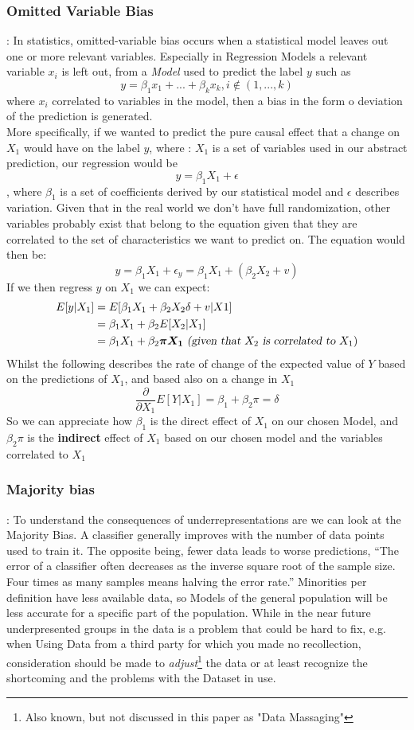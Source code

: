 \subsubsection{Omitted Variable Bias}:
In statistics, omitted-variable bias occurs when a statistical model leaves out one or more relevant variables. Especially in Regression Models a relevant variable $x_i$ is left out, from a \textsl{Model} used to predict the label $y$ such as $$y = \beta_1 x_1 + ... +\beta_k x_k, i\notin (1,...,k) $$ where $x_i$ correlated to variables in the model, then a bias in the form o deviation of the prediction is generated.\\
More specifically, if we wanted to predict the pure causal effect that a change on $X_1$ would have on the label $y$, where : $X_1$ is a set of variables used in our abstract prediction, our  regression would be $$y = \beta_1X_1 + \epsilon$$, where $\beta_1$ is a set of coefficients derived by our statistical model and $\epsilon$ describes variation. Given that in the real world we don't have full randomization, other variables probably exist that belong to the equation given that they are correlated to the set of characteristics we want to predict on. The equation would then be: $$y = \beta_1X_1 + \epsilon_y = \beta_1X_1 + (\beta_2X_2 + v)$$ If we then regress $y$ on $X_1$ we can expect:
\begin{align*}
  E[y|X_1] & = E[\beta_1X_1 + \beta_2X_2\delta+v | X1] \\
  &= \beta_1X_1 + \beta_2E[X_2|X_1] \\
  &= \beta_1X_1 + \beta_2\boldsymbol{\pi X_1}\textsl{ (given that } X_2 \textsl{ is correlated to } X_1)
\end{align*}
Whilst the following describes the rate of change of the expected value of $Y$ based on the predictions of $X_1$, and based also on a change in $X_1$
$$\frac{\partial}{\partial X_1}E[Y|X_1] = \beta_1 + \beta_2 \pi = \delta$$
So we can appreciate how $\beta_1$ is the direct effect of $X_1$ on our chosen Model, and $\beta_2 \pi$ is the \textbf{indirect} effect of $X_1$ based on our chosen model and the variables correlated to $X_1$
\subsubsection{Majority bias}:\label{MajorityBias}
To understand the consequences of underrepresentations are we can look at the Majority Bias.
A classifier generally improves with the number of data points used to train it. The opposite being, fewer data leads to worse predictions, “The error of a classifier often decreases as the inverse square root of the sample size. Four times as many samples means halving the error rate.” \cite{Varo18}
Minorities per definition have less available data, so Models of the general population will be less accurate for a specific part of the population. While in the near future underpresented groups in the data is a problem that could be hard to fix, e.g. when Using Data from a third party for which you made no recollection, consideration should be made to \textsl{adjust}\footnote{Also known, but not discussed in this paper as "Data Massaging"} the data or at least recognize the shortcoming and the problems with the Dataset in use.


